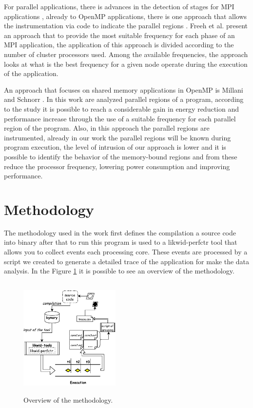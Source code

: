 \documentclass[conference,letter,10pt,final]{IEEEtran}
\begin{document}
For parallel applications, there is advances in the detection of
stages for MPI applications \cite{freeh2005exploring}, already to
OpenMP applications, there is one approach that allows the
instrumentation via code to indicate the parallel regions
\cite{millani2006fr}. Freeh et al.\cite{freeh2005exploring} present an 
approach that to provide the most suitable frequency for each phase of
an MPI application, the application of this approach is divided
according to the number of cluster processors used. Among the
available frequencies, the approach looks at what is the best
frequency for a given node operate during the execution of the
application.

An approach that focuses on shared memory applications in OpenMP is
Millani and Schnorr \cite{millani2006fr}. In this work are analyzed
parallel regions of a program, according to the study it is possible
to reach a considerable gain in energy reduction and performance
increase through the use of a suitable frequency for each parallel
region of the program. Also, in this approach the parallel regions are
instrumented, already in our work the parallel regions will be known
during program execution, the level of intrusion of our approach is
lower and it is possible to identify the behavior of the memory-bound
regions and from these reduce the processor frequency, lowering power
consumption and improving performance. 

\section{Methodology}
\label{sec:orgheadline3}
\label{sec:methodology}

The methodology used in the work first defines the compilation a
source code into binary after that to run this program is used to a
likwid-perfctr tool that allows you to collect events each processing
core. These events are processed by a script we created to generate a
detailed trace of the application for make the data analysis. In the
Figure \ref{figMetodologia} it is possible to see an overview of the
methodology.

\begin{figure}[!htb] \label{figMetodologia}
\caption{Overview of the methodology.}
\centering \includegraphics[width=5cm,height=6cm]{img/metodologiaWorkWsppd2016.pdf}
\end{figure}
\end{document}
